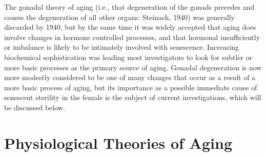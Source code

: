 The gonadal theory of aging (i.e., that degeneration of the gonads precedes and causes the degeneration of all other
organs: Steinach, 1940) was generally discarded by 1940, but by the same time it was widely accepted that aging does
involve changes in hormone controlled processes, and that hormonal insufficiently or imbalance is likely to be
intimately involved with senescence. Increasing biochemical sophistication was leading most investigators to look for
subtler or more basic processes as the primary source of aging. Gonadal degeneration is now more modestly considered to 
be one of many changes that occur as a result of a more basic process of aging, but its importance as a possible immediate cause of
senescent sterility in the female is the subject of current investigations, which will be discussed below.

\section{Physiological Theories of Aging}

